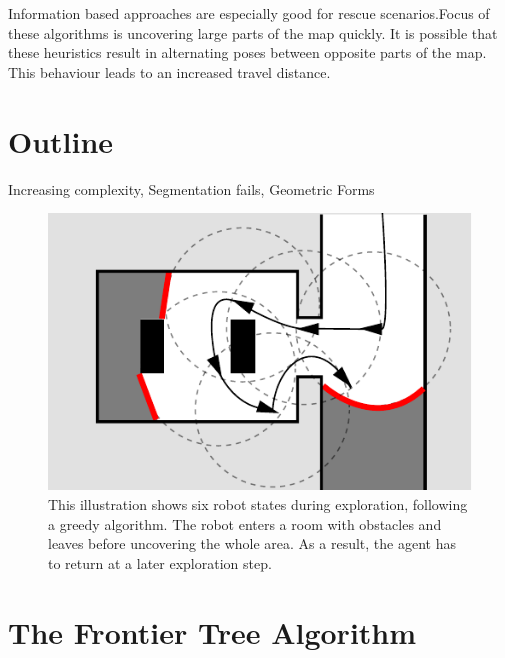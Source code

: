 \documentclass[twocolumn]{svjour3}[2016]
\begin{document}
Information based approaches are especially good for rescue scenarios.Focus of these algorithms is uncovering large parts of the map quickly. It is possible that these heuristics result in alternating poses between opposite parts of the map. This behaviour leads to an increased travel distance.\\

\section{Outline}
Increasing complexity, Segmentation fails, Geometric Forms

\begin{figure}
  \includegraphics{figures/fig1.pdf}
  \caption{
  This illustration shows six robot states during exploration, following a greedy algorithm. The robot enters a room with obstacles and leaves before uncovering the whole area. As a result, the agent has to return at a later exploration step.}
  \label{fig:1}       %
\end{figure}

\section{The Frontier Tree Algorithm}
\label{tfta}
\end{document}
